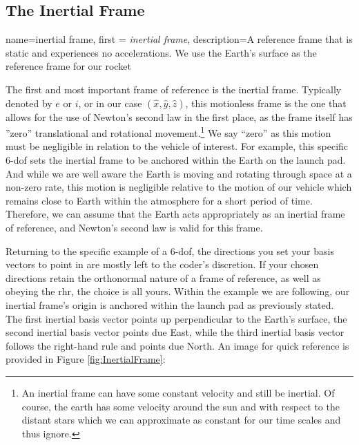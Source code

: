 \documentclass[12pt]{report}
\begin{document}
\subsection{The Inertial Frame}

{
    name=inertial frame,
    first = {\textit{inertial frame}},
    description={A reference frame that is static and experiences no accelerations. We use the Earth's surface as the reference frame for our rocket}
}

The first and most important frame of reference is the \gls{inertial frame}. Typically denoted by $e$ or $i$, or in our case $(\hat{x},\hat{y},\hat{z})$, this motionless frame is the one that allows for the use of Newton’s second law in the first place, as the frame itself has ''zero'' translational and rotational movement.\footnote{An \gls{inertial frame} can have some constant velocity and still be inertial. Of course, the earth has some velocity around the sun and with respect to the distant stars which we can approximate as constant for our time scales and thus ignore.} We say “zero” as this motion must be negligible in relation to the vehicle of interest. For example, this specific 6-\gls{dof} sets the \gls{inertial frame} to be anchored within the Earth on the launch pad. And while we are well aware the Earth is moving and rotating through space at a non-zero rate, this motion is negligible relative to the motion of our vehicle which remains close to Earth within the atmosphere for a short period of time. Therefore, we can assume that the Earth acts appropriately as an \gls{inertial frame} of reference, and Newton’s second law is valid for this frame. 


Returning to the specific example of a 6-\gls{dof}, the directions you set your basis vectors to point in are mostly left to the coder’s discretion. If your chosen directions retain the \gls{orthonormal} nature of a frame of reference, as well as obeying the \gls{rhr}, the choice is all yours. Within the example we are following, our \gls{inertial frame}’s origin is anchored within the launch pad as previously stated. The first inertial basis vector points up perpendicular to the Earth’s surface, the second inertial basis vector points due East, while the third inertial basis vector follows the right-hand rule and points due North. An image for quick reference is provided in Figure \ref{fig:InertialFrame}:
\end{document}
